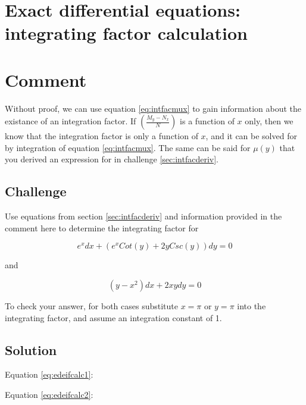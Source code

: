 
\timebox




\newpage
\section{Exact differential equations: integrating factor calculation}
\label{sec:edeifcalc}

\section*{Comment}
Without proof, we can use equation \ref{eq:intfacmux} to gain information about the existance of an integration factor. If $\left ( \frac{M_y-N_x}{N} \right )$ is a function of $x$ only, then we know that the integration factor is only a function of $x$, and it can be solved for by integration of equation \ref{eq:intfacmux}. The same can be said for $\mu(y)$ that you derived an expression for in challenge \ref{sec:intfacderiv}.

\subsection*{Challenge}
Use equations from section \ref{sec:intfacderiv} and information provided in the comment here to determine the integrating factor for

\begin{equation}
    \label{eq:edeifcalc1}
    e^x dx + (e^x Cot(y) + 2y Csc(y)) dy = 0
\end{equation}

and

\begin{equation}
    \label{eq:edeifcalc2}
    (y-x^2) dx + 2xy dy = 0
\end{equation}

To check your answer, for both cases substitute $x=\pi$ or $y=\pi$ into the integrating factor, and assume an integration constant of 1.

\subsection*{Solution}


Equation \ref{eq:edeifcalc1}: 

Equation \ref{eq:edeifcalc2}: 


\timebox




